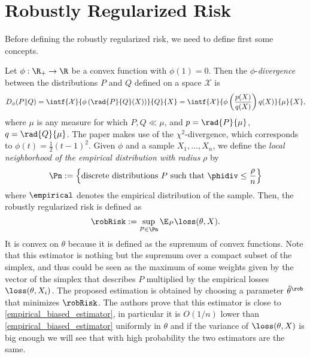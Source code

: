\section{Robustly Regularized Risk}

Before defining the robustly regularized risk, we need to define first some concepts.

Let $\phi : \R_+ \rightarrow \R$ be a convex function with $\phi(1) = 0$. Then the $\phi$-\textit{divergence} between the distributions $P$ and $Q$ defined on a space $\mathcal{X}$ is
\[
    D_{\phi}(P\| Q) = \intf{\mathcal{X}}{\phi\left(\rad{P}{Q}(X)\right)}{Q}{X} = \intf{\mathcal{X}}{ \phi\left(\frac{p(X)}{q(X)}\right) q(X)}{\mu}{X},
\]
where $\mu$ is any measure for which $P,Q  \ll \mu$, and $p= \rad{P}{\mu}$, $q = \rad{Q}{\mu}$. The paper makes use of the $\chi^2$-divergence, which corresponds to $\phi(t)=\frac{1}{2}(t-1)^2$. Given $\phi$ and a sample $X_1, \dots, X_n$, we define the \textit{local neighborhood of the empirical distribution with radius} $\rho$ by
\[
    \Pn := \left\{ \text{discrete distributions } P \text{ such that } \phidiv \leq \frac{\rho}{n} \right\}
\]
where $\empirical$ denotes the empirical distribution of the sample. Then, the robustly regularized risk is defined as
\[
    \robRisk := \sup_{P\in\Pn} \E_P \loss(\theta, X).
\]
It is convex on $\theta$ because it is defined as the supremum of convex functions. Note that this estimator is nothing but the supremum over a compact subset of the simplex, and thus could be seen as the maximum of some weights given by the vector of the simplex that describes $P$ multiplied by the empirical losses $\loss(\theta, X_i)$. The proposed estimation is obtained by choosing a parameter $\hat{\theta}^\rob$ that minimizes $\robRisk$. The authors prove that this estimator is close to \eqref{empirical_biased_estimator}, in particular it is $O(1/n)$ lower than  \eqref{empirical_biased_estimator} uniformly in $\theta$ and if the variance of $\loss(\theta, X)$ is big enough we will see that with high probability the two estimators are the same.

